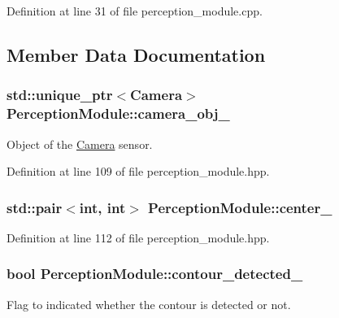 Definition at line 31 of file perception\+\_\+module.\+cpp.



\subsection{Member Data Documentation}
\subsubsection[{\texorpdfstring{camera\+\_\+obj\+\_\+}{camera_obj_}}]{\setlength{\rightskip}{0pt plus 5cm}std\+::unique\+\_\+ptr$<${\bf Camera}$>$ Perception\+Module\+::camera\+\_\+obj\+\_\+\hspace{0.3cm}{\ttfamily [private]}}\hypertarget{class_perception_module_af5250548d1ab0ab5574aa17fd99104e4}{}\label{class_perception_module_af5250548d1ab0ab5574aa17fd99104e4}


Object of the \hyperlink{class_camera}{Camera} sensor. 



Definition at line 109 of file perception\+\_\+module.\+hpp.

\subsubsection[{\texorpdfstring{center\+\_\+}{center_}}]{\setlength{\rightskip}{0pt plus 5cm}std\+::pair$<$int, int$>$ Perception\+Module\+::center\+\_\+\hspace{0.3cm}{\ttfamily [private]}}\hypertarget{class_perception_module_a67ea0e9f666e33bce8d81bf22098d168}{}\label{class_perception_module_a67ea0e9f666e33bce8d81bf22098d168}


Definition at line 112 of file perception\+\_\+module.\+hpp.

\subsubsection[{\texorpdfstring{contour\+\_\+detected\+\_\+}{contour_detected_}}]{\setlength{\rightskip}{0pt plus 5cm}bool Perception\+Module\+::contour\+\_\+detected\+\_\+\hspace{0.3cm}{\ttfamily [private]}}\hypertarget{class_perception_module_ab547d968284f6ab18a01b9776c54f38a}{}\label{class_perception_module_ab547d968284f6ab18a01b9776c54f38a}
Flag to indicated whether the contour is detected or not. 

